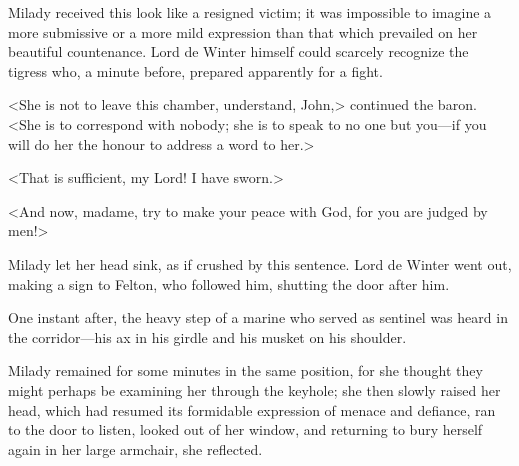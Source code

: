 Milady received this look like a resigned victim; it was impossible to imagine a more submissive or a more mild expression than that which prevailed on her beautiful countenance. Lord de Winter himself could scarcely recognize the tigress who, a minute before, prepared apparently for a fight. 

<She is not to leave this chamber, understand, John,> continued the baron. <She is to correspond with nobody; she is to speak to no one but you---if you will do her the honour to address a word to her.> 

<That is sufficient, my Lord! I have sworn.> 

<And now, madame, try to make your peace with God, for you are judged by men!> 

Milady let her head sink, as if crushed by this sentence. Lord de Winter went out, making a sign to Felton, who followed him, shutting the door after him. 

One instant after, the heavy step of a marine who served as sentinel was heard in the corridor---his ax in his girdle and his musket on his shoulder. 

Milady remained for some minutes in the same position, for she thought they might perhaps be examining her through the keyhole; she then slowly raised her head, which had resumed its formidable expression of menace and defiance, ran to the door to listen, looked out of her window, and returning to bury herself again in her large armchair, she reflected. 